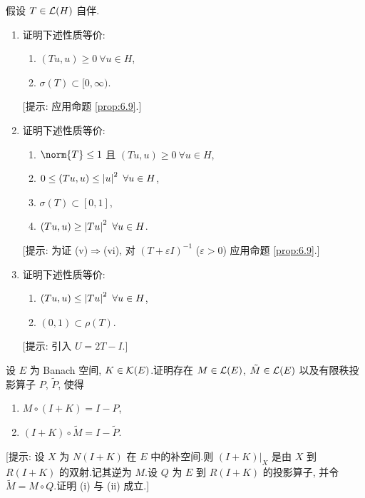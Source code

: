 \begin{exercise}
\label{exer:6.24}
假设 $T\in\mathcal{L}(H)$ 自伴.
\begin{enumerate}[label=\arabic*., leftmargin=2.2em, itemsep=0.3em]
	\item 证明下述性质等价:
	      \begin{enumerate}[label=(\roman*), leftmargin=2.4em, itemsep=0.1em]
	      	\item $(Tu,u)\ge0\ \forall u\in H$,
	      	\item $\sigma(T)\subset[0,\infty)$.
	      \end{enumerate}
	      [提示: 应用命题  \ref{prop:6.9}.]
	\item 证明下述性质等价:
	      \begin{enumerate}[label=(\roman*), leftmargin=2.4em, start=3, itemsep=0.1em]
	      	\item $\norm{T}\le1$ 且 $(Tu,u)\ge0\ \forall u\in H$,
	      	\item $0\le(Tu,u)\le\left|u\right|^2\ \forall u\in H$,
	      	\item $\sigma(T)\subset[0,1]$,
	      	\item $(Tu,u)\ge\left|Tu\right|^2\ \forall u\in H$.
	      \end{enumerate}
	      [提示: 为证 (v)$\Rightarrow$(vi), 对 $(T+\varepsilon I)^{-1}$
	      ($\varepsilon>0$) 应用命题  \ref{prop:6.9}.]
	\item 证明下述性质等价:
	      \begin{enumerate}[label=(\roman*), leftmargin=2.4em, start=7, itemsep=0.1em]
	      	\item $(Tu,u)\le\left|Tu\right|^2\ \forall u\in H$,
	      	\item $(0,1)\subset\rho(T)$.
	      \end{enumerate}
	      [提示: 引入 $U=2T-I$.]
\end{enumerate}
\end{exercise}

\begin{exercise}
\label{exer:6.25}
设 $E$ 为 Banach 空间, $K\in\mathcal{K}(E)$.证明存在
$M\in\mathcal{L}(E)$, $\tilde M\in\mathcal{L}(E)$ 以及有限秩投影算子 $P$, $\tilde P$,
使得
\begin{enumerate}[label=(\roman*), leftmargin=2.6em, itemsep=0.15em]
	\item $M\circ(I+K)=I-P$,
	\item $(I+K)\circ\tilde M=I-\tilde P$.
\end{enumerate}
[提示: 设 $X$ 为 $N(I+K)$ 在 $E$ 中的补空间.则 $(I+K)|_X$ 是由 $X$ 到
$R(I+K)$ 的双射.记其逆为 $M$.设 $Q$ 为 $E$ 到 $R(I+K)$ 的投影算子,
并令 $\tilde M=M\circ Q$.证明 (i) 与 (ii) 成立.]
\end{exercise}

